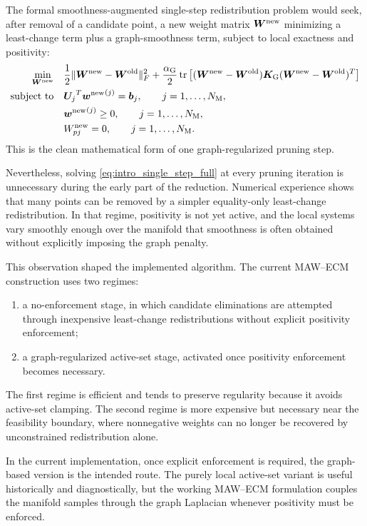 \documentclass[11pt,a4paper]{article}
\begin{document}
The formal smoothness-augmented single-step redistribution problem would seek,
after removal of a candidate point, a new weight matrix $\bm W^{\mathrm{new}}$ minimizing a
least-change term plus a graph-smoothness term, subject to local exactness and
positivity:
\[
\begin{aligned}
\min_{\bm W^{\mathrm{new}}}
&\quad
\frac{1}{2}\|\bm W^{\mathrm{new}}-\bm W^{\mathrm{old}}\|_F^2
+
\frac{\alpha_{\mathrm{G}}}{2}
\operatorname{tr}\left[
(\bm W^{\mathrm{new}}-\bm W^{\mathrm{old}})\bm K_{\mathrm{G}}(\bm W^{\mathrm{new}}-\bm W^{\mathrm{old}})^T
\right]
\\
\text{subject to}
&\quad
{\bm U_j}^T{\bm w^{\mathrm{new}}}^{(j)}=\bm b_j,
\qquad
j=1,\ldots,N_{\mathrm{M}},
\\
&\quad
{\bm w^{\mathrm{new}}}^{(j)}\geq 0,
\qquad
j=1,\ldots,N_{\mathrm{M}},
\\
&\quad
W^{\mathrm{new}}_{pj}=0,
\qquad
j=1,\ldots,N_{\mathrm{M}} .
\end{aligned}
\label{eq:intro_single_step_full}
\]
This is the clean mathematical form of one graph-regularized pruning step.

Nevertheless, solving \eqref{eq:intro_single_step_full} at every pruning
iteration is unnecessary during the early part of the reduction. Numerical
experience shows that many points can be removed by a simpler equality-only
least-change redistribution. In that regime, positivity is not yet active, and
the local systems vary smoothly enough over the manifold that smoothness is
often obtained without explicitly imposing the graph penalty.

This observation shaped the implemented algorithm. The current MAW--ECM
construction uses two regimes:
\begin{enumerate}[label=(\roman*),leftmargin=1.1cm]
    \item a no-enforcement stage, in which candidate eliminations are attempted
    through inexpensive least-change redistributions without explicit
    positivity enforcement;
    \item a graph-regularized active-set stage, activated once positivity
    enforcement becomes necessary.
\end{enumerate}
The first regime is efficient and tends to preserve regularity because it avoids
active-set clamping. The second regime is more expensive but necessary near the
feasibility boundary, where nonnegative weights can no longer be recovered by
unconstrained redistribution alone.

In the current implementation, once explicit enforcement is required, the
graph-based version is the intended route. The purely local active-set variant
is useful historically and diagnostically, but the working MAW--ECM formulation
couples the manifold samples through the graph Laplacian whenever positivity
must be enforced.
\end{document}
